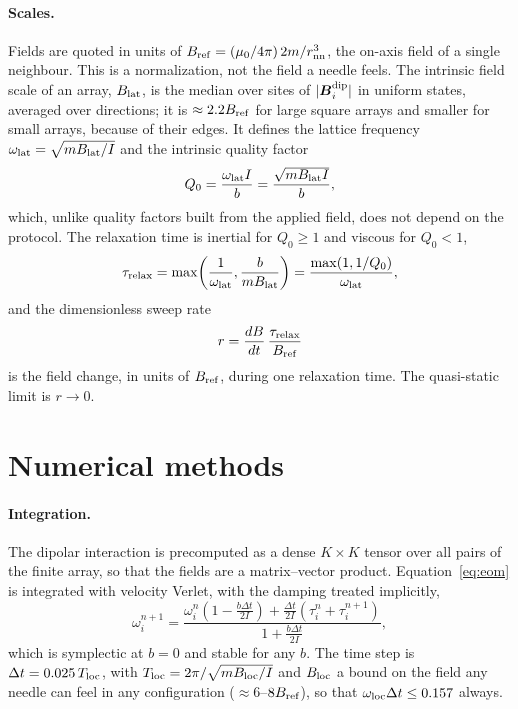 \documentclass[pre,twocolumn,superscriptaddress,showpacs,floatfix]{revtex4-2}
\newcommand{\vect}[1]{\boldsymbol{#1}}
\newcommand{\Bref}{B_{\rm ref}}
\newcommand{\Blat}{B_{\rm lat}}
\begin{document}
\paragraph{Scales.} Fields are quoted in units of $\Bref=(\mu_0/4\pi)\,2m/r_{\rm nn}^3$, the on-axis field of a single neighbour. This is a normalization, not the field a needle feels. The intrinsic field scale of an array, $\Blat$, is the median over sites of $|\vect B_i^{\rm dip}|$ in uniform states, averaged over directions; it is $\approx2.2\Bref$ for large square arrays and smaller for small arrays, because of their edges. It defines the lattice frequency $\omega_{\rm lat}=\sqrt{m\Blat/I}$ and the intrinsic quality factor
\begin{equation}
Q_0=\frac{\omega_{\rm lat}I}{b}=\frac{\sqrt{m\Blat I}}{b},
\end{equation}
which, unlike quality factors built from the applied field, does not depend on the protocol. The relaxation time is inertial for $Q_0\ge1$ and viscous for $Q_0<1$,
\begin{equation}
\tau_{\rm relax}=\max\!\left(\frac{1}{\omega_{\rm lat}},\frac{b}{m\Blat}\right)=\frac{\max(1,1/Q_0)}{\omega_{\rm lat}},
\end{equation}
and the dimensionless sweep rate
\begin{equation}
r=\frac{dB}{dt}\,\frac{\tau_{\rm relax}}{\Bref}
\end{equation}
is the field change, in units of $\Bref$, during one relaxation time. The quasi-static limit is $r\to0$.

\section{Numerical methods}
\label{sec:methods}

\paragraph{Integration.} The dipolar interaction is precomputed as a dense $K\times K$ tensor over all pairs of the finite array, so that the fields are a matrix--vector product. Equation~\eqref{eq:eom} is integrated with velocity Verlet, with the damping treated implicitly,
\begin{equation}
\omega_i^{n+1}=\frac{\omega_i^n\left(1-\frac{b\Delta t}{2I}\right)+\frac{\Delta t}{2I}\left(\tau_i^n+\tau_i^{n+1}\right)}{1+\frac{b\Delta t}{2I}},
\end{equation}
which is symplectic at $b=0$ and stable for any $b$. The time step is $\Delta t=0.025\,T_{\rm loc}$, with $T_{\rm loc}=2\pi/\sqrt{mB_{\rm loc}/I}$ and $B_{\rm loc}$ a bound on the field any needle can feel in any configuration ($\approx6$--$8\Bref$), so that $\omega_{\rm loc}\Delta t\le0.157$ always.
\end{document}
